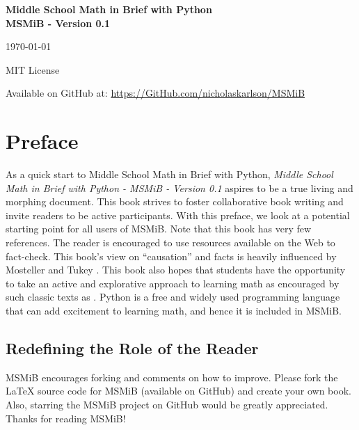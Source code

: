 \documentclass{book}
\begin{document}
\begin{titlepage}
    \centering
    \vspace*{5cm}
    {\Huge\textbf{Middle School Math in Brief with Python\\ MSMiB - Version 0.1}\par}
    \vspace{2cm}
    {\Large\today\par}
    \vspace{1cm}
    {\large MIT License\par}
    \vspace{1cm}
    {Available on GitHub at: \url{https://GitHub.com/nicholaskarlson/MSMiB}\par}
\end{titlepage}

\tableofcontents
\cleardoublepage

\chapter*{Preface}
As a quick start to Middle School Math in Brief with Python, \emph{Middle School Math in Brief with Python - MSMiB - Version 0.1} aspires to be a true living and morphing document. This book strives to foster collaborative book writing and invite readers to be active participants. With this preface, we look at a potential starting point for all users of MSMiB. Note that this book has very few references. The reader is encouraged to use resources available on the Web to fact-check. This book's view on ``causation'' and facts is heavily influenced by Mosteller and Tukey \cite{mosteller1977}. This book also hopes that students have the opportunity to take an active and explorative approach to learning math as encouraged by such classic texts as \cite{polya1945}. Python is a free and widely used programming language that can add excitement to learning math, and hence it is included in MSMiB.

\section*{Redefining the Role of the Reader}
MSMiB encourages forking and comments on how to improve. Please fork the LaTeX source code for MSMiB (available on GitHub) and create your own book. Also, starring the MSMiB project on GitHub would be greatly appreciated. Thanks for reading MSMiB!
\end{document}
